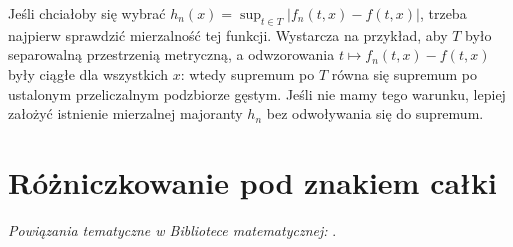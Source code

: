 \begin{uwaga}
Jeśli chciałoby się wybrać $h_n(x)=\sup_{t\in T}|f_n(t,x)-f(t,x)|$,
trzeba najpierw sprawdzić mierzalność tej funkcji. Wystarcza
na przykład, aby $T$ było separowalną przestrzenią metryczną,
a odwzorowania $t\mapsto f_n(t,x)-f(t,x)$ były ciągłe dla
wszystkich $x$: wtedy supremum po $T$ równa się supremum
po ustalonym przeliczalnym podzbiorze gęstym. Jeśli nie
mamy tego warunku, lepiej założyć istnienie mierzalnej
majoranty $h_n$ bez odwoływania się do supremum.
\end{uwaga}

\section{Różniczkowanie pod znakiem całki}

\noindent\emph{Powiązania tematyczne w Bibliotece matematycznej:} .


